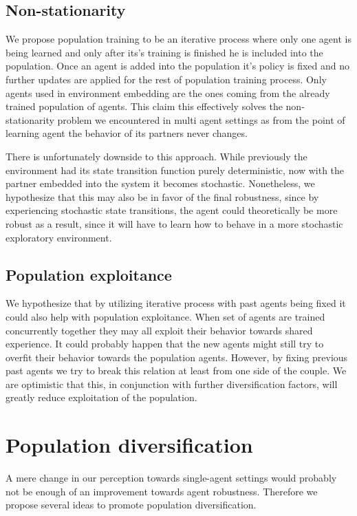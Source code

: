 \subsection{Non-stationarity}
We propose population training to be an iterative process where only one agent is being learned and only after its's training is finished he is included into the population.
Once an agent is added into the population it's policy is fixed and no further updates are applied for the rest of population training process.
Only agents used in environment embedding are the ones coming from the already trained population of agents.
This claim this effectively solves the non-stationarity problem we encountered in multi agent settings as from the point of learning agent the behavior of its partners never changes.

There is unfortunately downside to this approach.
While previously the environment had its state transition function purely deterministic, now with the partner embedded into the system it becomes stochastic.
Nonetheless, we hypothesize that this may also be in favor of the final robustness, since by experiencing stochastic state transitions, the agent could theoretically be more robust as a result, since it will have to learn how to behave in a more stochastic exploratory environment.

\subsection{Population exploitance}
We hypothesize that by utilizing iterative process with past agents being fixed it could also help with population exploitance.
When set of agents are trained concurrently together they may all exploit their behavior towards shared experience.
It could probably happen that the new agents might still try to overfit their behavior towards the population agents.
However, by fixing previous past agents we try to break this relation at least from one side of the couple.
We are optimistic that this, in conjunction with further diversification factors, will greatly reduce exploitation of the population.


\section{Population diversification}
A mere change in our perception towards single-agent settings would probably not be enough of an improvement towards agent robustness.
Therefore we propose several ideas to promote population diversification.

